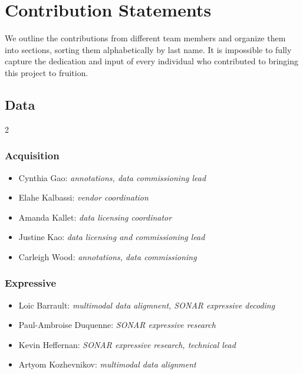 
\newpage
\section*{Contribution Statements}
We outline the contributions from different team members and organize them into sections, sorting them alphabetically by last name. It is impossible to fully capture the dedication and input of every individual who contributed to bringing this project to fruition.

\vspace{10pt}

\subsection*{Data}
\begin{multicols}{2}

\subsubsection*{Acquisition}
\begin{itemize}[itemsep=0.00cm,parsep=0.0cm,left=0pt, label={}]
\item Cynthia Gao: \textit{annotations, data commissioning lead}
\item Elahe Kalbassi: \textit{vendor coordination}
\item Amanda Kallet: \textit{data licensing coordinator}
\item Justine Kao: \textit{data licensing and commissioning lead}
\item Carleigh Wood: \textit{annotations, data commissioning }
\end{itemize}

\subsubsection*{Expressive}
\begin{itemize}[itemsep=0.00cm,parsep=0.0cm,left=0pt, label={}]
\item Loic Barrault: \textit{multimodal data aligmnent, SONAR expressive decoding}
\item Paul-Ambroise Duquenne: \textit{SONAR expressive research}
\item Kevin Heffernan: \textit{SONAR expressive research, technical lead}
\item Artyom Kozhevnikov: \textit{multimodal data alignment}
\end{itemize}


\end{multicols}
